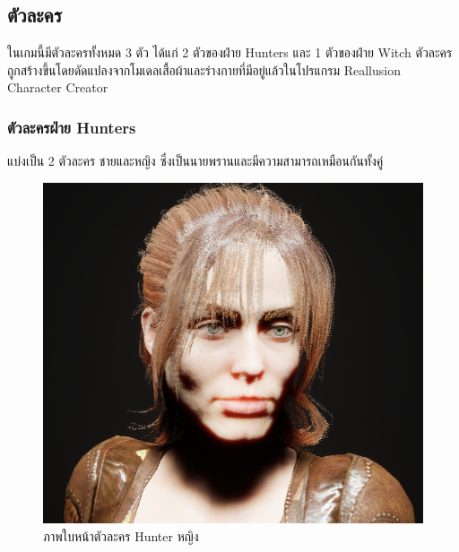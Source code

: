 \subsection{ตัวละคร}

ในเกมนี้มีตัวละครทั้งหมด 3 ตัว ได้แก่ 2 ตัวของฝ่าย Hunters และ 1 ตัวของฝ่าย Witch ตัวละครถูกสร้างขึ้นโดยดัดแปลงจากโมเดลเสื้อผ้าและร่างกายที่มีอยู่แล้วในโปรแกรม Reallusion Character Creator

\subsubsection{ตัวละครฝ่าย Hunters}

แบ่งเป็น 2 ตัวละคร ชายและหญิง ซึ่งเป็นนายพรานและมีความสามารถเหมือนกันทั้งคู่

\begin{figure}
  \centering
  \begin{subcaptionblock}{.4\textwidth}
    \centering
    \includegraphics[width=.8\linewidth]{./img/characters/emma_face.png}
    \caption{ภาพใบหน้าตัวละคร Hunter หญิง}\label{ภาพใบหน้าตัวละคร Hunter หญิง}
  \end{subcaptionblock}%
  \begin{subcaptionblock}{.4\textwidth}
    \centering

\end{subcaptionblock}
\end{figure}
